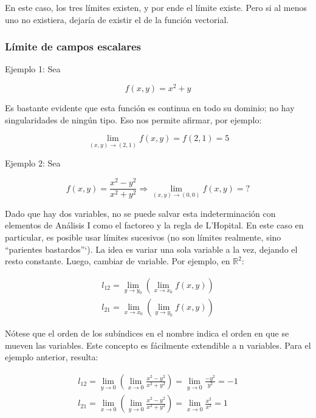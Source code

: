 \documentclass{article}
\renewcommand{\Bbb}{\mathbb}
\begin{document}
En este caso, los tres límites existen, y por ende el límite existe. Pero si al menos uno no existiera, dejaría de existir el de la función vectorial.

\subsubsection{Límite de campos escalares}

Ejemplo 1: Sea

\begin{equation}
f(x,y) = x^2 + y
\end{equation}

Es bastante evidente que esta función es continua en todo su dominio; no hay singularidades de ningún tipo. Eso nos permite afirmar, por ejemplo:

\begin{equation}
\lim_{(x,y) \rightarrow (2,1)} f(x,y) = f(2,1) = 5
\end{equation}

Ejemplo 2: Sea

\begin{equation}
f(x,y) = \frac{x^2 - y^2}{x^2 + y^2} \Rightarrow \lim_{(x,y) \rightarrow (0,0)} f(x,y) = ?
\end{equation}

Dado que hay dos variables, no se puede salvar esta indeterminación con elementos de Análisis I como el factoreo y la regla de L'Hopital. En este caso en particular, es posible usar límites sucesivos (no son límites realmente, sino ``parientes bastardos''`). La idea es variar una sola variable a la vez, dejando el resto constante. Luego, cambiar de variable. Por ejemplo, en $\Bbb R^2$:

\begin{subequations}
\begin{align}
l_{12} = \lim_{y \rightarrow y_0} \left( \lim_{x \rightarrow x_0} f(x,y) \right) \\
l_{21} = \lim_{x \rightarrow x_0} \left( \lim_{y \rightarrow y_0} f(x,y) \right)
\end{align}
\end{subequations}

Nótese que el orden de los subíndices en el nombre indica el orden en que se mueven las variables. Este concepto es fácilmente extendible a n variables. Para el ejemplo anterior, resulta:

\begin{subequations}
\begin{align}
l_{12} = \lim_{y \rightarrow 0} \left( \lim_{x \rightarrow 0} \frac{x^2-y^2}{x^2 + y^2} \right) = \lim_{y \rightarrow 0} \frac{-y^2}{y^2} = -1 \\
l_{21} = \lim_{x \rightarrow 0} \left( \lim_{y \rightarrow 0} \frac{x^2-y^2}{x^2 + y^2} \right) = \lim_{x \rightarrow 0} \frac{x^2}{x^2} = 1
\end{align}
\end{subequations}
\end{document}
